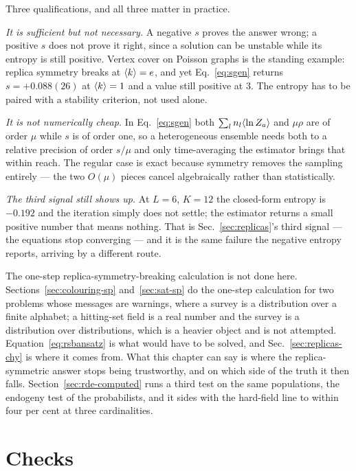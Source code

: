Three qualifications, and all three matter in practice.

\emph{It is sufficient but not necessary.} A negative $s$ proves the answer
wrong; a positive $s$ does not prove it right, since a solution can be unstable
while its entropy is still positive. Vertex cover on Poisson graphs is the
standing example: replica symmetry breaks at $\langle k \rangle=e$, and yet
Eq.~\eqref{eq:sgen} returns $s=+0.088(26)$ at $\langle k \rangle=1$ and a value still
positive at $3$. The entropy has to be paired with a stability criterion, not
used alone.

\emph{It is not numerically cheap.} In Eq.~\eqref{eq:sgen} both
$\sum_{l}n_{l}\langle \ln Z_{a} \rangle$ and $\mu\rho$ are of order $\mu$ while $s$
is of order one, so a heterogeneous ensemble needs both to a relative precision of order
$s/\mu$ and only time-averaging the estimator brings that within reach. The
regular case is exact because symmetry removes the sampling entirely --- the two
$O(\mu)$ pieces cancel algebraically rather than statistically.

\emph{The third signal still shows up.} At $L=6$, $K=12$ the closed-form entropy
is $-0.192$ and the iteration simply does not settle; the estimator returns a
small positive number that means nothing. That is Sec.~\ref{sec:replicas}'s
third signal --- the equations stop converging --- and it is the same failure
the negative entropy reports, arriving by a different route.

The one-step replica-symmetry-breaking calculation is not done here.
Sections~\ref{sec:colouring-sp} and~\ref{sec:sat-sp} do the one-step
calculation for two problems whose messages are warnings, where a survey is a
distribution over a finite alphabet; a hitting-set field is a real number and
the survey is a distribution over distributions, which is a heavier object and
is not attempted. Equation~\eqref{eq:rsbansatz} is what would have to be solved,
and Sec.~\ref{sec:replicas-chy} is where it comes from. What this chapter can say is where the replica-symmetric
answer stops being trustworthy, and on which side of the truth it then
falls. Section~\ref{sec:rde-computed} runs a third test on the same
populations, the endogeny test of the probabilists, and it sides with the
hard-field line to within four per cent at three cardinalities.

\section{Checks}
\label{sec:hs-checks}

